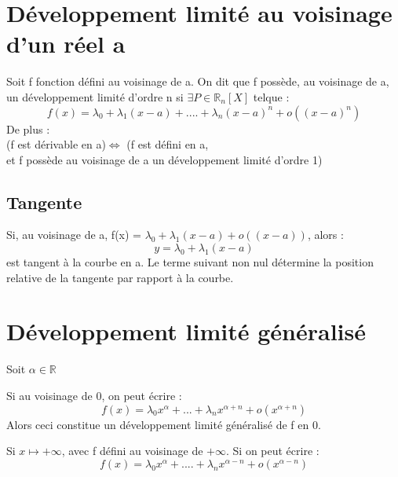 \section{Développement limité au voisinage d'un réel a}
\begin{de}
Soit f fonction défini au voisinage de a. On dit que f possède, au voisinage de a, un développement limité d'ordre n si $\exists P \in \mathbb{R}_n[X]$ telque :
$$f(x) = \lambda_0+\lambda_1(x-a)+....+\lambda_n(x-a)^n+o((x-a)^n)$$
De plus : \\
(f est dérivable en a)$\Leftrightarrow$ (f est défini en a, \\et f possède au voisinage de a un développement limité d'ordre 1)
\end{de}
\subsection{Tangente}
\begin{prop}
 Si, au voisinage de a, f(x) = $\lambda_0+\lambda_1(x-a)+o((x-a))$, alors :
$$y = \lambda_0+\lambda_1(x-a)$$
est tangent à la courbe en a. Le terme suivant non nul détermine la position relative de la tangente par rapport à la courbe.
\end{prop}
\section{Développement limité généralisé}
Soit $\alpha \in \mathbb{R}$
\begin{de}
Si au voisinage de 0, on peut écrire :
$$f(x)=\lambda_0x^{\alpha}+...+\lambda_nx^{\alpha+n}+o(x^{\alpha+n})$$
Alors ceci constitue un développement limité généralisé de f en 0. 
\end{de}
\begin{de}
Si $x\mapsto +\infty$, avec f défini au voisinage de $+\infty$. Si on peut écrire : 
$$f(x)=\lambda_0x^{\alpha}+....+\lambda_nx^{\alpha-n}+o(x^{\alpha-n})$$
\end{de}
